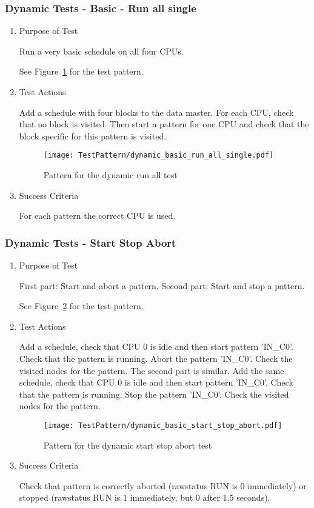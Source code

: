 \subsubsection{Dynamic Tests - Basic - Run all single}
\begin{enumerate}
	\item Purpose of Test

    Run a very basic schedule on all four CPUs.

	See Figure~\ref{fig:Pattern_for_the_dynamic_run_all_test} for the test pattern.
	\item Test Actions

	Add a schedule with four blocks to the data master. For each CPU, check that no block is visited. Then start 
	a pattern for one CPU and check that the block specific for this pattern is visited.
    \begin{figure}
        \centering 
        \texttt{[image: TestPattern/dynamic\_basic\_run\_all\_single.pdf]}
        \caption{Pattern for the dynamic run all test}
        \label{fig:Pattern_for_the_dynamic_run_all_test}
    \end{figure}
	\item Success Criteria

	For each pattern the correct CPU is used.
\end{enumerate}
\subsubsection{Dynamic Tests - Start Stop Abort}
\begin{enumerate}
	\item Purpose of Test

    First part: Start and abort a pattern. Second part: Start and stop a pattern.

	See Figure~\ref{fig:Pattern_for_the_dynamic_start_stop_abort_test} for the test pattern.
	\item Test Actions
    
    Add a schedule, check that CPU 0 is idle and then start pattern 'IN\_C0'. Check that the pattern is running. 
    Abort the pattern 'IN\_C0'. Check the visited nodes for the pattern. The second part is similar. 
    Add the same schedule, check that CPU 0 is idle and then start pattern 'IN\_C0'. Check that the pattern is running. 
    Stop the pattern 'IN\_C0'. Check the visited nodes for the pattern.
    \begin{figure}
        \centering 
        \texttt{[image: TestPattern/dynamic\_basic\_start\_stop\_abort.pdf]}
        \caption{Pattern for the dynamic start stop abort test}
        \label{fig:Pattern_for_the_dynamic_start_stop_abort_test}
    \end{figure}
	\item Success Criteria

	Check that pattern is correctly aborted (rawstatus RUN is 0 immediately) or 
	stopped (rawstatus RUN is 1 immediately, but 0 after 1.5 seconds).
\end{enumerate}
